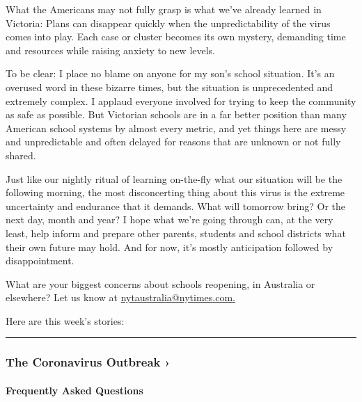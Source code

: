 What the Americans may not fully grasp is what we've already learned in
Victoria: Plans can disappear quickly when the unpredictability of the
virus comes into play. Each case or cluster becomes its own mystery,
demanding time and resources while raising anxiety to new levels.

To be clear: I place no blame on anyone for my son's school situation.
It's an overused word in these bizarre times, but the situation is
unprecedented and extremely complex. I applaud everyone involved for
trying to keep the community as safe as possible. But Victorian schools
are in a far better position than many American school systems by almost
every metric, and yet things here are messy and unpredictable and often
delayed for reasons that are unknown or not fully shared.

Just like our nightly ritual of learning on-the-fly what our situation
will be the following morning, the most disconcerting thing about this
virus is the extreme uncertainty and endurance that it demands. What
will tomorrow bring? Or the next day, month and year? I hope what we're
going through can, at the very least, help inform and prepare other
parents, students and school districts what their own future may hold.
And for now, it's mostly anticipation followed by disappointment.

What are your biggest concerns about schools reopening, in Australia or
elsewhere? Let us know at
\href{mailto:nytaustralia@nytimes.com}{nytaustralia@nytimes.com.}

Here are this week's stories:

\begin{center}\rule{0.5\linewidth}{\linethickness}\end{center}

\href{https://www.nytimes.com/news-event/coronavirus?action=click\&pgtype=Article\&state=default\&region=MAIN_CONTENT_3\&context=storylines_faq}{}

\hypertarget{the-coronavirus-outbreak-}{%
\subsubsection{The Coronavirus Outbreak
›}\label{the-coronavirus-outbreak-}}

\hypertarget{frequently-asked-questions}{%
\paragraph{Frequently Asked
Questions}\label{frequently-asked-questions}}

